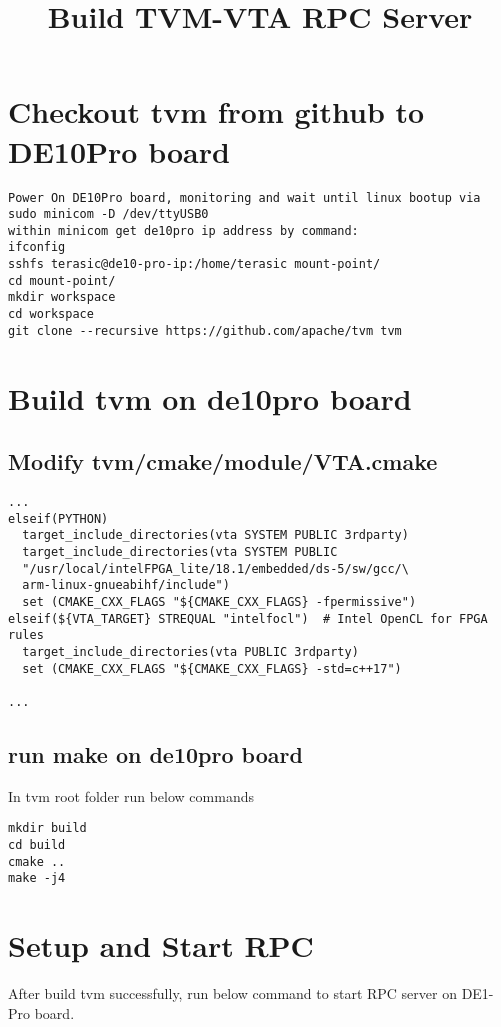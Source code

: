 \documentclass{article}
\title{Build TVM-VTA RPC Server}
\begin{document}
\maketitle


\section{Checkout tvm from github to DE10Pro board}
\begin{lstlisting}
Power On DE10Pro board, monitoring and wait until linux bootup via
sudo minicom -D /dev/ttyUSB0
within minicom get de10pro ip address by command:
ifconfig 
sshfs terasic@de10-pro-ip:/home/terasic mount-point/
cd mount-point/
mkdir workspace
cd workspace
git clone --recursive https://github.com/apache/tvm tvm

\end{lstlisting}
\section{Build tvm on de10pro board}
\subsection{Modify tvm/cmake/module/VTA.cmake}
\begin{lstlisting}
...
elseif(PYTHON)
  target_include_directories(vta SYSTEM PUBLIC 3rdparty)
  target_include_directories(vta SYSTEM PUBLIC
  "/usr/local/intelFPGA_lite/18.1/embedded/ds-5/sw/gcc/\
  arm-linux-gnueabihf/include")
  set (CMAKE_CXX_FLAGS "${CMAKE_CXX_FLAGS} -fpermissive")
elseif(${VTA_TARGET} STREQUAL "intelfocl")  # Intel OpenCL for FPGA rules
  target_include_directories(vta PUBLIC 3rdparty)
  set (CMAKE_CXX_FLAGS "${CMAKE_CXX_FLAGS} -std=c++17")

...
\end{lstlisting}

\subsection{run make on de10pro board}
In tvm root folder run below commands
\begin{lstlisting}
mkdir build
cd build
cmake ..
make -j4
\end{lstlisting}

\section{Setup and Start RPC}
After build tvm successfully, run below command to start RPC server on DE1-Pro board.
\end{document}
